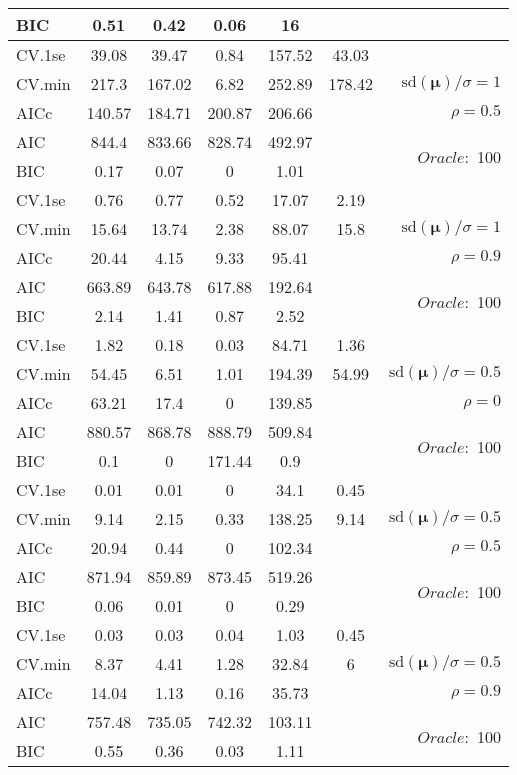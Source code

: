 \begin{table}
\begin{center}
\begin{tabular}{l*{5}{c}|r}
BIC & 0.51 & 0.42 & 0.06 & 16 & &  \\
 \hline 
CV.1se & 39.08 & 39.47 & 0.84 & 157.52 & 43.03 & \\
CV.min & 217.3 & 167.02 & 6.82 & 252.89 & 178.42 &  $\mathrm{sd}(\mathbf{\mu})/\sigma=1$ \\
AICc & 140.57 & 184.71 & 200.87 & 206.66 & & $\rho=0.5$ \\
AIC & 844.4 & 833.66 & 828.74 & 492.97 & &  \multirow{2}{*}{$Oracle: $ 100} \\
BIC & 0.17 & 0.07 & 0 & 1.01 & &  \\
 \hline 
CV.1se & 0.76 & 0.77 & 0.52 & 17.07 & 2.19 & \\
CV.min & 15.64 & 13.74 & 2.38 & 88.07 & 15.8 &  $\mathrm{sd}(\mathbf{\mu})/\sigma=1$ \\
AICc & 20.44 & 4.15 & 9.33 & 95.41 & & $\rho=0.9$ \\
AIC & 663.89 & 643.78 & 617.88 & 192.64 & &  \multirow{2}{*}{$Oracle: $ 100} \\
BIC & 2.14 & 1.41 & 0.87 & 2.52 & &  \\
 \hline 
CV.1se & 1.82 & 0.18 & 0.03 & 84.71 & 1.36 & \\
CV.min & 54.45 & 6.51 & 1.01 & 194.39 & 54.99 &  $\mathrm{sd}(\mathbf{\mu})/\sigma=0.5$ \\
AICc & 63.21 & 17.4 & 0 & 139.85 & & $\rho=0$ \\
AIC & 880.57 & 868.78 & 888.79 & 509.84 & &  \multirow{2}{*}{$Oracle: $ 100} \\
BIC & 0.1 & 0 & 171.44 & 0.9 & &  \\
 \hline 
CV.1se & 0.01 & 0.01 & 0 & 34.1 & 0.45 & \\
CV.min & 9.14 & 2.15 & 0.33 & 138.25 & 9.14 &  $\mathrm{sd}(\mathbf{\mu})/\sigma=0.5$ \\
AICc & 20.94 & 0.44 & 0 & 102.34 & & $\rho=0.5$ \\
AIC & 871.94 & 859.89 & 873.45 & 519.26 & &  \multirow{2}{*}{$Oracle: $ 100} \\
BIC & 0.06 & 0.01 & 0 & 0.29 & &  \\
 \hline 
CV.1se & 0.03 & 0.03 & 0.04 & 1.03 & 0.45 & \\
CV.min & 8.37 & 4.41 & 1.28 & 32.84 & 6 &  $\mathrm{sd}(\mathbf{\mu})/\sigma=0.5$ \\
AICc & 14.04 & 1.13 & 0.16 & 35.73 & & $\rho=0.9$ \\
AIC & 757.48 & 735.05 & 742.32 & 103.11 & &  \multirow{2}{*}{$Oracle: $ 100} \\
BIC & 0.55 & 0.36 & 0.03 & 1.11 & &  \\
 \hline 
\end{tabular}
\end{center}
\vspace{-1cm}
\end{table}





